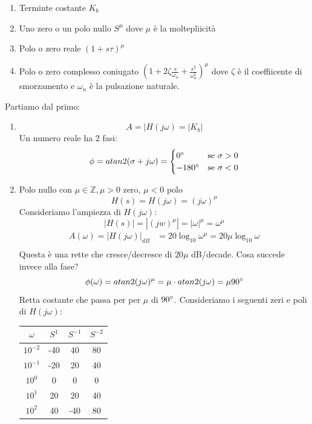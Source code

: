 \documentclass[a4paper]{article}
\begin{document}
\begin{enumerate}
    \item Terminte costante $K_b$
    \item Uno zero o un polo nullo $S^\mu$ dove $\mu$ è la moltepliicità
    \item Polo o zero reale $(1 + s\tau)^{\mu}$
    \item Polo o zero complesso coniugato $\left(1 + 2\zeta \frac{s}{\omega_n} + \frac{s^2}{\omega_n^2}\right)^\mu$
    dove $\zeta$ è il coeffiicente di smorzamento e $\omega_n$ è la pulsazione naturale.
\end{enumerate}
Partiamo dal primo:
\begin{enumerate}
    \item  \[A = |H(j\omega) = |K_b|\]
     Un numero reale ha 2 fasi:
    \[\phi = atan2(\sigma + j\omega) = \begin{cases}
        0\degree & \text{se } \sigma > 0\\
        -180\degree & \text{se } \sigma < 0 
    \end{cases}\]
    \item Polo nullo 
    con $\mu \in \mathbb{Z}, \mu > 0$ zero, $\mu < 0$ polo
    \[H(s) = H(j\omega) = (j\omega)^{\mu}\]
    Consideriamo l'ampiezza di $H(j\omega)$:
    \[|H(s)| = |(jw)^\mu| = |\omega|^\mu = \omega^\mu\]
    \begin{align*}
        A(\omega) = |H(j\omega)|_{dB} &= 20\log_{10} \omega^\mu = 20\mu \log_{10} \omega\\
    \end{align*}
    Questa è una rette che cresce/decresce di $20\mu$ dB/decade.
    Cosa succede invece alla fase?
    \[\phi(\omega) = atan2(j\omega)^{\mu} = \mu \cdot atan2(j\omega) = \mu 90\degree\]
    Retta costante che passa per per $\mu$ di $90\degree$. Consideriamo i seguenti zeri e poli di $H(j\omega)$:
    \begin{table}[H]
        \centering
        \begin{tabular}{c|c|c|c}
            $\omega$ & $S^1$ & $S^{-1}$ & $S^{-2}$\\
            \hline
            $10^{-2}$ &-40 & 40 & 80\\
            $10^{-1}$ &-20 & 20 & 40\\
            $10^0$ & 0 & 0 & 0\\
            $10^1$ & 20 & 20 & 40\\
            $10^2$ & 40 & -40 & 80\\
        \end{tabular}

\end{table}
\end{enumerate}
\end{document}
